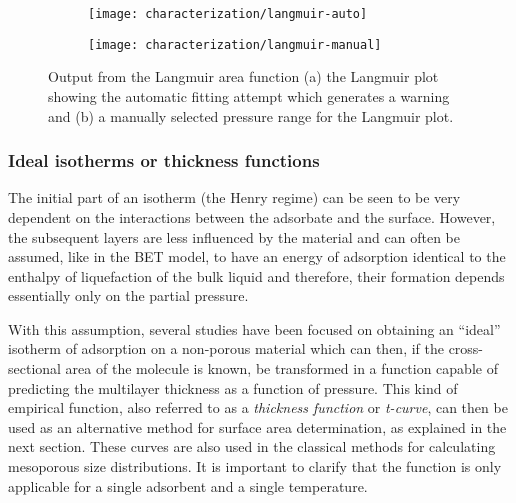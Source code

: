 \begin{figure}[!htb]
	\centering

	\begin{subfigure}{0.45\linewidth}
		\parbox[c]{0.1\linewidth}{\caption{}%
			\label{pyg:fgr:langmuirarea-auto}}
		\parbox[b]{0.85\linewidth}{%
			\texttt{[image: characterization/langmuir-auto]}}
	\end{subfigure}%
	\begin{subfigure}{0.45\linewidth}
		\parbox[c]{0.1\linewidth}{\caption{}%
			\label{pyg:fgr:langmuirarea-manual}}
		\parbox[b]{0.85\linewidth}{%
			\texttt{[image: characterization/langmuir-manual]}}
	\end{subfigure}%

	\caption{Output from the Langmuir area function (a) the Langmuir plot
		showing the automatic fitting attempt which generates a warning and (b) a manually
		selected pressure range for the Langmuir plot.}%
	\label{pyg:fgr:langmuirarea}

\end{figure}

\subsubsection{Ideal isotherms or thickness functions}\label{pyg:charac:tcurve}

The initial part of an isotherm (the Henry regime) can be seen to
be very dependent on the interactions between the adsorbate and the
surface. However, the subsequent layers are less influenced by the
material and can often be assumed, like in the BET model,
to have an energy of adsorption identical to the enthalpy of liquefaction
of the bulk liquid and therefore, their formation depends essentially
only on the partial pressure.

With this assumption, several studies have been focused on obtaining
an ``ideal'' isotherm of adsorption on a non-porous material which can
then, if the cross-sectional area of the molecule is known, be transformed
in a function capable of predicting the multilayer thickness
as a function of pressure. This kind of empirical function,
also referred to as a \textit{thickness function} or \textit{t-curve},
can then be used as an
alternative method for surface area determination, as explained in
the next section. These curves are also used in the classical methods
for calculating mesoporous size distributions. It is important to
clarify that the function is only applicable for a single adsorbent
and a single temperature.

